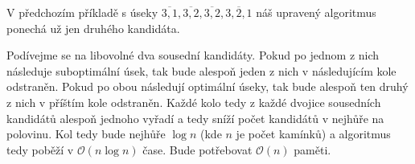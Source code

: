\documentclass{article}
\begin{document}
V předchozím příkladě s úseky $\overline{3,1},\overline{3,2},\overline{3,2},\overline{3,2,1}$ náš upravený algoritmus ponechá už jen druhého kandidáta.

Podívejme se na libovolné dva sousední kandidáty. Pokud po jednom z nich následuje suboptimální úsek, tak bude alespoň jeden z nich v následujícím kole odstraněn. Pokud po obou následují optimální úseky, tak bude alespoň ten druhý z nich v příštím kole odstraněn. Každé kolo tedy z každé dvojice sousedních kandidátů alespoň jednoho vyřadí a tedy sníží počet kandidátů v nejhůře na polovinu. Kol tedy bude nejhůře $\log n$ (kde $n$ je počet kamínků) a algoritmus tedy poběží v $\mathcal{O} \left(n \log n\right)$ čase. Bude potřebovat $\mathcal{O} \left(n\right)$ paměti.
\end{document}
